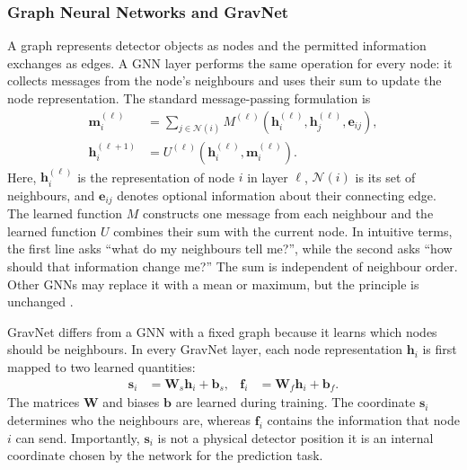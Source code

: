 \subsubsection{Graph Neural Networks and GravNet}
\label{sec:gnn_gravnet_background}

A graph represents detector objects as nodes and the permitted information
exchanges as edges. A GNN layer performs the same operation for every node: it
collects messages from the node's neighbours and uses their sum to update the
node representation. The standard message-passing formulation is
\begin{align}
    \mathbf{m}_i^{(\ell)}
    &=
    \sum_{j\in\mathcal{N}(i)}
    M^{(\ell)}\!\left(
        \mathbf{h}_i^{(\ell)},
        \mathbf{h}_j^{(\ell)},
        \mathbf{e}_{ij}
    \right),
    \label{eq:generic_message}\\
    \mathbf{h}_i^{(\ell+1)}
    &=
    U^{(\ell)}\!\left(
        \mathbf{h}_i^{(\ell)},
        \mathbf{m}_i^{(\ell)}
    \right).
    \label{eq:generic_update}
\end{align}
Here, \(\mathbf{h}_i^{(\ell)}\) is the representation of node \(i\) in layer
\(\ell\), \(\mathcal{N}(i)\) is its set of neighbours, and
\(\mathbf{e}_{ij}\) denotes optional information about their connecting edge.
The learned function \(M\) constructs one message from each neighbour and the
learned function \(U\) combines their sum with the current node. In intuitive
terms, the first line asks ``what do my neighbours tell me?'', while the second
asks ``how should that information change me?'' The sum is independent of
neighbour order. Other GNNs may replace it with a mean or maximum, but the
principle is unchanged \cite{gilmer2017-message-passing,duarte2020-gnn-tracking}.

GravNet differs from a GNN with a fixed graph because it learns which nodes
should be neighbours. In every GravNet layer, each node representation
\(\mathbf{h}_i\) is first mapped to two learned quantities:
\begin{align}
    \mathbf{s}_i &= \mathbf{W}_s\mathbf{h}_i+\mathbf{b}_s,
    &
    \mathbf{f}_i &= \mathbf{W}_f\mathbf{h}_i+\mathbf{b}_f.
    \label{eq:gravnet_projections}
\end{align}
The matrices \(\mathbf{W}\) and biases \(\mathbf{b}\) are learned during
training. The coordinate \(\mathbf{s}_i\) determines who the neighbours are,
whereas \(\mathbf{f}_i\) contains the information that node \(i\) can send.
Importantly, \(\mathbf{s}_i\) is not a physical detector position it is an
internal coordinate chosen by the network for the prediction task.

